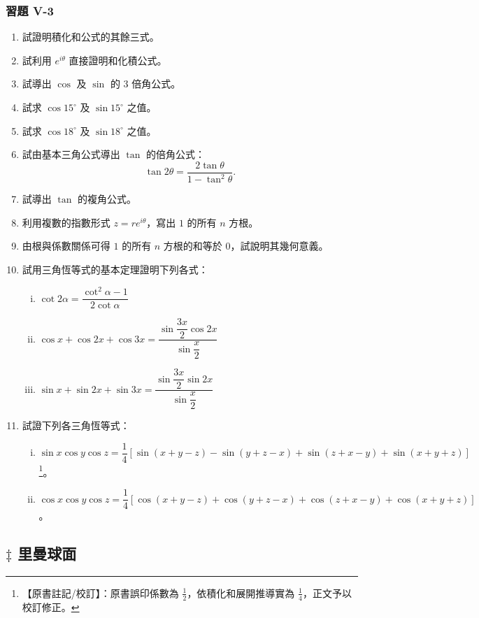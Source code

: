 \subsubsection*{習題 V-3}

\begin{enumerate}
  \item 試證明積化和公式的其餘三式。
  \item 試利用 $e^{i\theta}$ 直接證明和化積公式。
  \item 試導出 $\cos$ 及 $\sin$ 的 $3$ 倍角公式。
  \item 試求 $\cos 15^\circ$ 及 $\sin 15^\circ$ 之值。
  \item[$^*$\theenumi.] 試求 $\cos 18^\circ$ 及 $\sin 18^\circ$ 之值。
  \item 試由基本三角公式導出 $\tan$ 的倍角公式：
  \[
  \tan 2\theta = \frac{2\tan\theta}{1-\tan^2\theta}.
  \]
  \item 試導出 $\tan$ 的複角公式。
  \item[$^*$\theenumi.] 利用複數的指數形式 $z=re^{i\theta}$，寫出 $1$ 的所有 $n$ 方根。
  \item 由根與係數關係可得 $1$ 的所有 $n$ 方根的和等於 $0$，試說明其幾何意義。
  \item 試用三角恆等式的基本定理證明下列各式：
  \begin{enumerate}[(i)]
    \item $\cot 2\alpha = \dfrac{\cot^2\alpha-1}{2\cot\alpha}$
    \item $\cos x+\cos 2x+\cos 3x = \dfrac{\sin\dfrac{3x}{2}\cos 2x}{\sin\dfrac{x}{2}}$
    \item $\sin x+\sin 2x+\sin 3x = \dfrac{\sin\dfrac{3x}{2}\sin 2x}{\sin\dfrac{x}{2}}$
  \end{enumerate}
  \item 試證下列各三角恆等式：
  \begin{enumerate}[(i)]
    \item $\sin x\cos y\cos z = \dfrac{1}{4}[\sin(x+y-z)-\sin(y+z-x)+\sin(z+x-y)+\sin(x+y+z)]$\label{note:b4-ch5-p286-errata}\footnote{【原書註記/校訂】：原書誤印係數為 $\frac{1}{2}$，依積化和展開推導實為 $\frac{1}{4}$，正文予以校訂修正。}。
    \item $\cos x\cos y\cos z = \dfrac{1}{4}[\cos(x+y-z)+\cos(y+z-x)+\cos(z+x-y)+\cos(x+y+z)]$。
  \end{enumerate}
\end{enumerate}


\subsection{\texorpdfstring{$\ddagger$ }{‡ }里曼球面}\label{sec:b4-5-4}

